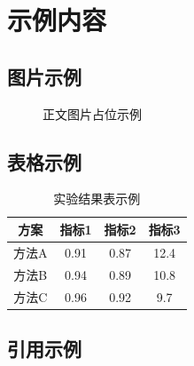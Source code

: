 \chapter{示例内容}

\section{图片示例}
\placeholderpar

\begin{figure}[htbp]
  \centering
  \fbox{\rule{0pt}{5cm}\rule{0.78\textwidth}{0pt}}
  \caption{正文图片占位示例}
\end{figure}

\section{表格示例}
\placeholderpar

\begin{table}[htbp]
  \centering
  \caption{实验结果表示例}
  \begin{tabular}{cccc}
    \toprule
    方案 & 指标1 & 指标2 & 指标3 \\
    \midrule
    方法A & 0.91 & 0.87 & 12.4 \\
    方法B & 0.94 & 0.89 & 10.8 \\
    方法C & 0.96 & 0.92 & 9.7 \\
    \bottomrule
  \end{tabular}
\end{table}

\section{引用示例}
\placeholderpar{}
